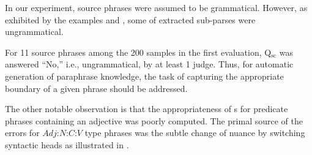 \documentclass[english]{jnlp_1.4}
\begin{document}
In our experiment, source phrases were assumed to be grammatical.
However, as exhibited by the examples  and
, some of extracted sub-parses were ungrammatical.
\begin{multicols}{2}
\end{multicols}
{\noindent}For 11 source phrases among the 200 samples in the first
evaluation, Q$_{\textrm{sc}}$ was answered ``No,'' i.e.,
ungrammatical, by at least 1 judge.  Thus, for automatic generation of
paraphrase knowledge, the task of capturing the appropriate boundary
of a given phrase should be addressed.

The other notable observation is that the appropriateness of {\pc}s
for predicate phrases containing an adjective was poorly computed.
The primal source of the errors for $Adj$:$N$:$C$:$V$ type phrases was
the subtle change of nuance by switching syntactic heads as
illustrated in .
\begin{multicols}{2}
\end{multicols}
\end{document}
